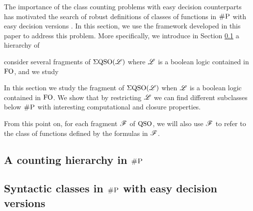 The importance of the class counting problems with easy decision counterparts has motivated the search of robust definitions of classes of functions in $\text{\sc \#P}$ with easy decision versions \cite{PagourtzisZ06}. In this section, we use the framework developed in this paper to address this problem. More specifically, we introduce in Section \ref{sec-hier-shp} a hierarchy of 


consider several fragments of $\Sigma{\rm QSO}(\mathscr{L})$ where $\mathscr{L}$ is a boolean logic contained in ${\rm FO}$, and we study 






In this section we study the fragment of $\Sigma{\rm QSO}(\mathscr{L})$ when $\mathscr{L}$ is a boolean logic contained in ${\rm FO}$. We show that by restricting $\mathscr{L}$ we can find different subclasses below $\text{\sc \#P}$ with interesting computational and closure properties. 

\cite{OH93,FH08}

From this point on, for each fragment $\mathscr{F}$ of ${\rm QSO}$, we will also use $\mathscr{F}$ to refer to the class of functions defined by the formulas in $\mathscr{F}$.

\subsection{A counting hierarchy in $\text{\sc \#P}$}
\label{sec-hier-shp}


\subsection{Syntactic classes in $\text{\sc \#P}$ with easy decision versions}
\label{sec-clo-horn}


